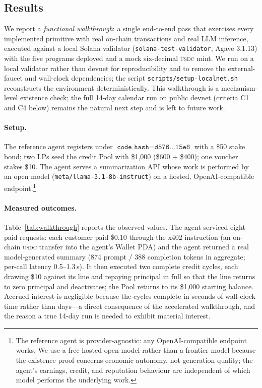 \documentclass[10pt,conference,letterpaper]{IEEEtran}
\theoremstyle{definition}
\newcommand{\codehash}{\texttt{code\_hash}}
\newcommand{\USDC}{\textsc{usdc}}
\begin{document}
\subsection{Results}

We report a \emph{functional walkthrough}: a single end-to-end pass that
exercises every implemented primitive with real on-chain transactions and
real LLM inference, executed against a local Solana validator
(\texttt{solana-test-validator}, Agave 3.1.13) with the five programs
deployed and a mock six-decimal \USDC{} mint. We run on a local validator
rather than devnet for reproducibility and to remove the external-faucet and
wall-clock dependencies; the script \texttt{scripts/setup-localnet.sh}
reconstructs the environment deterministically. This walkthrough is a
mechanism-level existence check; the full 14-day calendar run on public
devnet (criteria C1 and C4 below) remains the natural next step and is left
to future work.

\paragraph{Setup.} The reference agent registers under
$\codehash = \texttt{d576\ldots15e8}$ with a \$50 stake bond; two LPs seed
the credit Pool with \$1{,}000 (\$600 + \$400); one voucher stakes \$10. The
agent serves a summarization API whose work is performed by an open model
(\texttt{meta/llama-3.1-8b-instruct}) on a hosted, OpenAI-compatible
endpoint.\footnote{The reference agent is provider-agnostic: any
OpenAI-compatible endpoint works. We use a free hosted open model rather than
a frontier model because the existence proof concerns economic autonomy, not
generation quality; the agent's earnings, credit, and reputation behaviour are
independent of which model performs the underlying work.}

\paragraph{Measured outcomes.} Table~\ref{tab:walkthrough} reports the
observed values. The agent serviced eight paid requests: each customer paid
\$0.10 through the x402 instruction (an on-chain \USDC{} transfer into the
agent's Wallet PDA) and the agent returned a real model-generated summary
(874 prompt / 388 completion tokens in aggregate; per-call latency
0.5--1.3\,s). It then executed two complete credit cycles, each drawing \$10
against its line and repaying principal in full so that the line returns to
zero principal and deactivates; the Pool returns to its \$1{,}000 starting
balance. Accrued interest is negligible because the cycles complete in
seconds of wall-clock time rather than days---a direct consequence of the
accelerated walkthrough, and the reason a true 14-day run is needed to
exhibit material interest.
\end{document}
